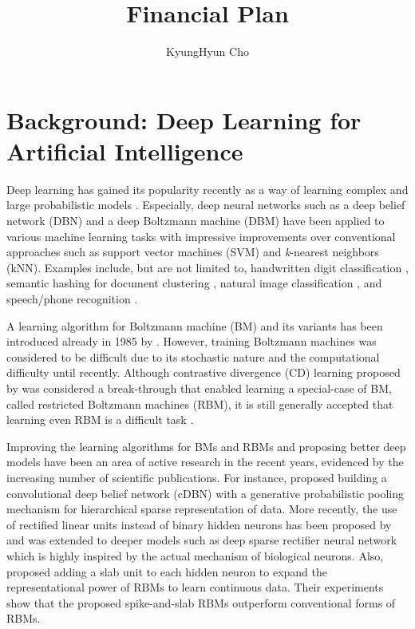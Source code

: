 \documentclass[11pt, oneside]{essay}
\title{Financial Plan}
\author{KyungHyun Cho}
\begin{document}
\maketitle

\section{Background: Deep Learning for Artificial
Intelligence}

Deep learning has gained its popularity recently as a way of
learning complex and large probabilistic models \citep[see,
e.g.,][]{Bengio2009a}.  Especially, deep neural networks
such as a deep belief network (DBN) \citep{Hinton2006} and a
deep Boltzmann machine (DBM) \citep{Salakhutdinov2009a} have
been applied to various machine learning tasks with
impressive improvements over conventional approaches such as
support vector machines (SVM) and \emph{k}-nearest neighbors
(kNN).  Examples include, but are not limited to,  
handwritten digit classification
\citep{Hinton2006,Salakhutdinov2009a}, semantic hashing
for document clustering
\citep{Hinton2006,Salakhutdinov2009s}, natural image
classification
\citep{Krizhevsky2009,Krizhevsky2010,Coates2010,Ranzato2010,Ranzato2010a}, and 
speech/phone recognition \citep{Mohamed2010}.

A learning algorithm for Boltzmann machine (BM) and its variants
has been introduced already in 1985 by \citet{Ackley1985}.
However, training Boltzmann machines was considered to be
difficult due to its stochastic nature and the computational
difficulty until recently. Although contrastive divergence
(CD) learning proposed by \citet{Hinton2002} was considered
a break-through that enabled learning a special-case of BM,
called restricted Boltzmann machines (RBM), it is still
generally accepted that learning even RBM is a difficult
task \citep[see, e.g.,][for examples of poor training
results of RBMs]{Schulz2010,Fischer2010,Desjardins2009}.


Improving the learning algorithms for BMs and RBMs and
proposing better deep models have been
an area of active research in the recent years, evidenced by
the increasing number of scientific publications.
For instance, \citet{Lee2009} proposed building a
convolutional deep belief network (cDBN) with a generative
probabilistic pooling mechanism for hierarchical sparse
representation of data. More recently, the use of
rectified linear units instead of binary hidden neurons has
been proposed by \citet{Nair2010} and was extended to deeper
models such as deep sparse rectifier neural network
\citep{Glorot2011} which is highly inspired by the actual
mechanism of biological neurons. Also, \citet{Courville2011}
proposed adding a slab unit to each hidden neuron to expand
the representational power of RBMs to learn continuous data.
Their experiments show that the proposed spike-and-slab RBMs
outperform conventional forms of RBMs.
\end{document}
